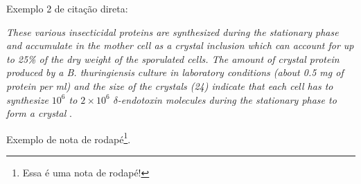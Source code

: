 Exemplo 2 de citação direta:

\begin{citacao}
	\textit{These various insecticidal proteins are synthesized during the stationary phase and accumulate in the mother cell as a crystal inclusion which can account for up to 25\% of the dry weight of the sporulated cells. The amount of crystal protein produced by a B. thuringiensis culture in laboratory conditions (about 0.5 mg of protein per ml) and the size of the crystals (24) indicate that each cell has to synthesize $10^6$ to $2 \times 10^6$ $\delta$-endotoxin molecules during the stationary phase to form a crystal} \cite[p. 1]{Agaisse1995}.
\end{citacao}

Exemplo de nota de rodapé\footnote{Essa é uma nota de rodapé!}.
